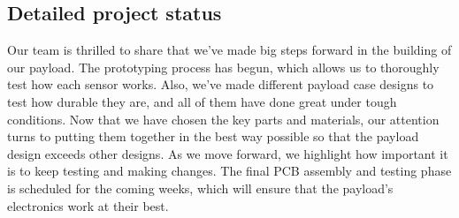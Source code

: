 \subsection{Detailed project status}

Our team is thrilled to share that we've made big steps forward in the building of our payload. The prototyping process has begun, which allows us to thoroughly test how each sensor works. Also, we've made different payload case designs to test how durable they are, and all of them have done great under tough conditions. Now that we have chosen the key parts and materials, our attention turns to putting them together in the best way possible so that the payload design exceeds other designs. As we move forward, we highlight how important it is to keep testing and making changes. The final PCB assembly and testing phase is scheduled for the coming weeks, which will ensure that the payload's electronics work at their best.